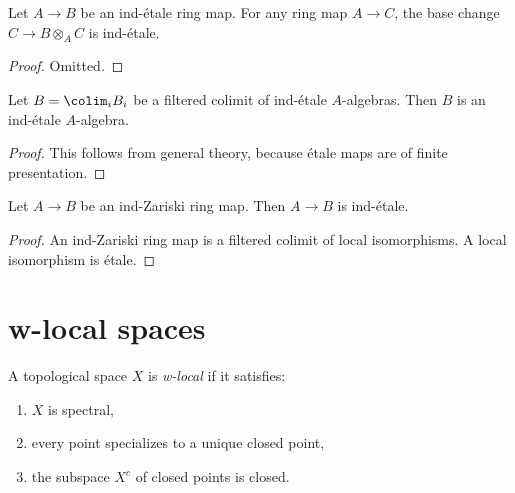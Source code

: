 \begin{lemma}
  \label{thm:ind-etale-base-change}
  \leanok
  Let $A \to B$ be an ind-étale ring map. For any ring map $A \to C$, the base change 
  $C \to B \otimes_A C$ is ind-étale.
\end{lemma}

\begin{proof}
  \leanok
  Omitted.
\end{proof}

\begin{lemma}
    Let $B = \colim_i B_i$ be a filtered colimit of ind-étale $A$-algebras. Then $B$ is
    an ind-étale $A$-algebra.
    \label{lemma:ind-ind-etale}
    \leanok
\end{lemma}

\begin{proof}
    \leanok
    This follows from general theory, because étale maps are of finite presentation.
\end{proof}

\begin{lemma}
  Let $A \to B$ be an ind-Zariski ring map. Then $A \to B$ is ind-étale.
  \label{thm:ind-Zariski-is-ind-etale}
  \leanok
\end{lemma}

\begin{proof}
  \leanok
  An ind-Zariski ring map is a filtered colimit of local isomorphisms. A local isomorphism is étale.
\end{proof}

\section{w-local spaces}

\begin{definition}
    \label{def:w-local-space}
    \leanok
    A topological space \(X\) is \emph{w-local} if it satisfies:
    \begin{enumerate}
        \item \(X\) is spectral,
        \item every point specializes to a unique closed point,
        \item the subspace \(X^c\) of closed points is closed.
    \end{enumerate}
\end{definition}

